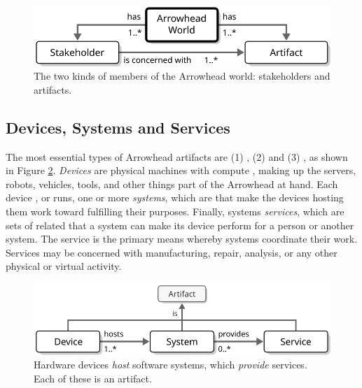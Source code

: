 \vfill

\begin{figure}[ht!]
  \centering
  \includegraphics[scale=0.9]{figures/world}
  \caption{
    The two kinds of members of the Arrowhead world: stakeholders and artifacts.
  }
  \label{fig:world}
\end{figure}

\vspace*{-3mm}

\subsection{Devices, Systems and Services}

The most essential types of Arrowhead artifacts are (1) , (2)  and (3) , as shown in Figure \ref{fig:device-system-service}.
\textit{Devices} are physical machines with compute , making up the servers, robots, vehicles, tools, and other things part of the Arrowhead  at hand.
Each device , or runs, one or more \textit{systems}, which are   that make the devices hosting them work toward fulfilling their purposes.
Finally, systems  \textit{services}, which are sets of related  that a system can make its device perform for a person or another system.
The service is the primary means whereby systems coordinate their work.
Services may be concerned with manufacturing, repair, analysis, or any other physical or virtual activity.

\vfill

\begin{figure}[ht!]
  \centering
  \includegraphics[scale=0.9]{figures/device-system-service}
  \caption{
    Hardware devices \textit{host} software systems, which \textit{provide} services.
    Each of these is an artifact.
  }
  \label{fig:device-system-service}
\end{figure}

